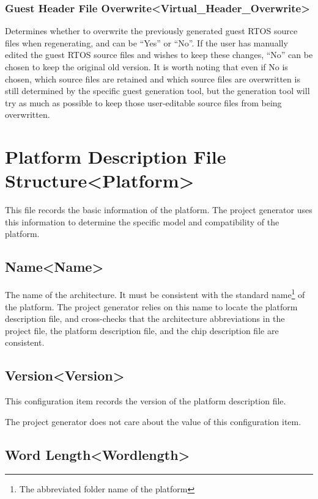 \subsubsection{Guest Header File Overwrite<Virtual\_Header\_Overwrite>{}}\label{subsubsec:5-3-15-13}

Determines whether to overwrite the previously generated guest RTOS source files when regenerating, and can be ``Yes'' or ``No''. If the user has manually edited the guest RTOS source files and wishes to keep these changes, ``No'' can be chosen to keep the original old version. It is worth noting that even if No is chosen, which source files are retained and which source files are overwritten is still determined by the specific guest generation tool, but the generation tool will try as much as possible to keep those user-editable source files from being overwritten.
\section{Platform Description File Structure<Platform>{}}\label{sec:5-4}

This file records the basic information of the platform. The project generator uses this information to determine the specific model and compatibility of the platform.

\subsection{Name<Name>{}}\label{subsec:5-4-1}

The name of the architecture. It must be consistent with the standard name\footnote{The abbreviated folder name of the platform} of the platform. The project generator relies on this name to locate the platform description file, and cross-checks that the architecture abbreviations in the project file, the platform description file, and the chip description file are consistent.

\subsection{Version<Version>{}}\label{subsec:5-4-2}

This configuration item records the version of the platform description file.

The project generator does not care about the value of this configuration item.

\subsection{Word Length<Wordlength>{}}\label{subsec:5-4-3}

